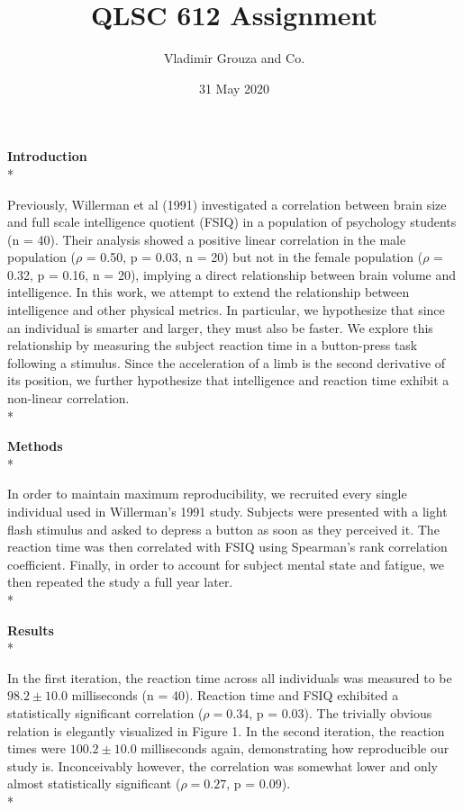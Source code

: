 \documentclass{article}
\title{QLSC 612 Assignment}
\author{Vladimir Grouza and Co.}
\date{31 May 2020}
\begin{document}
\maketitle

\textbf{Introduction}\\*

Previously, Willerman et al (1991) investigated a correlation between brain size and full scale intelligence quotient (FSIQ) in a population of psychology students (n = 40). Their analysis showed a positive linear correlation in the male population ($\rho$ = 0.50, p = 0.03, n = 20) but not in the female population ($\rho$ = 0.32, p = 0.16, n = 20), implying a direct relationship between brain volume and intelligence. In this work, we attempt to extend the relationship between intelligence and other physical metrics. In particular, we hypothesize that since an individual is smarter and larger, they must also be faster. We explore this relationship by measuring the subject reaction time in a button-press task following a stimulus. Since the acceleration of a limb is the second derivative of its position, we further hypothesize that intelligence and reaction time exhibit a non-linear correlation. \\*

\textbf{Methods} \\*

In order to maintain maximum reproducibility, we recruited every single individual used in Willerman's 1991 study. Subjects were presented with a light flash stimulus and asked to depress a button as soon as they perceived it. The reaction time was then correlated with FSIQ using Spearman's rank correlation coefficient. Finally, in order to account for subject mental state and fatigue, we then repeated the study a full year later.\\*

\textbf{Results}\\*

In the first iteration, the reaction time across all individuals was measured to be $98.2 \pm 10.0$ milliseconds (n = 40). Reaction time and FSIQ exhibited a statistically significant correlation ($\rho = 0.34$, p = 0.03). The trivially obvious relation is elegantly visualized in Figure 1. In the second iteration, the reaction times were $100.2 \pm 10.0$ milliseconds again, demonstrating how reproducible our study is. Inconceivably however, the correlation was somewhat lower and only almost statistically significant ($\rho = 0.27$, p = 0.09). \\*
\end{document}
